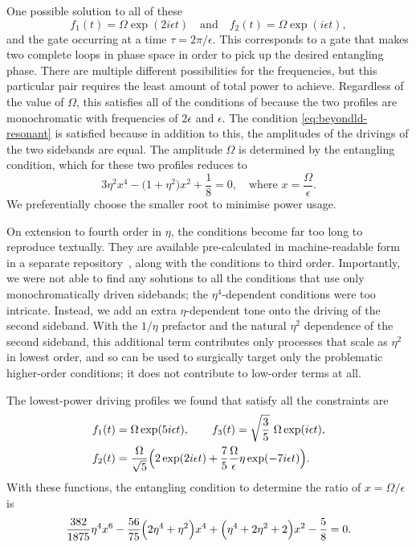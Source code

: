 One possible solution to all of these
\begin{equation}\label{eq:beyondld-drive-2}
f_1(t) = \Omega\exp(2i\epsilon t) \quad\text{and}\quad f_2(t) = \Omega\exp(i\epsilon t),
\end{equation}
and the gate occurring at a time $\tau = 2\pi/\epsilon$.
This corresponds to a gate that makes two complete loops in phase space in order to pick up the desired entangling phase.
There are multiple different possibilities for the frequencies, but this particular pair requires the least amount of total power to achieve.
Regardless of the value of $\Omega$, this satisfies all of the conditions of  because the two profiles are monochromatic with frequencies of $2\epsilon$ and $\epsilon$.
The condition \cref{eq:beyondld-resonant} is satisfied because in addition to this, the amplitudes of the drivings of the two sidebands are equal.
The amplitude $\Omega$ is determined by the entangling condition, which for these two profiles reduces to
\begin{equation}
3\eta^2x^4 - \bigl(1 + \eta^2\bigr)x^2 + \frac18 = 0,\quad\text{where $x=\frac\Omega\epsilon$}.
\end{equation}
We preferentially choose the smaller root to minimise power usage.

On extension to fourth order in $\eta$, the conditions become far too long to reproduce textually.
They are available pre-calculated in machine-readable form in a separate repository~\cite{Sameti2021Code}, along with the conditions to third order.
Importantly, we were not able to find any solutions to all the conditions that use only monochromatically driven sidebands; the $\eta^4$-dependent conditions were too intricate.
Instead, we add an extra $\eta$-dependent tone onto the driving of the second sideband.
With the $1/\eta$ prefactor and the natural $\eta^2$ dependence of the second sideband, this additional term contributes only processes that scale as $\eta^2$ in lowest order, and so can be used to surgically target only the problematic higher-order conditions; it does not contribute to low-order terms at all.

The lowest-power driving profiles we found that satisfy all the constraints are
\begin{equation}\label{eq:beyondld-drive-3}\begin{aligned}
f_1(t) &= \Omega\exp(5i\epsilon t), \qquad f_3(t) = \sqrt{\frac{3}{5}}\ \Omega\exp(i\epsilon t),\\
f_2(t) &= \frac{\Omega}{\sqrt{5}}\Bigl(2\exp(2i\epsilon t) + \frac{7}{5}\frac{\Omega}{\epsilon}\eta\exp(-7i\epsilon t)\Bigr).
\end{aligned}\end{equation}
With these functions, the entangling condition to determine the ratio of $x = \Omega/\epsilon$ is
\begin{equation}\label{eq:beyondld-three-sideband-entangling}
    \frac{382}{1875}\eta^4x^6 - \frac{56}{75}\Bigl(2\eta^4+\eta^2\Bigr)x^4
    +\Bigl(\eta^4 + 2\eta^2 + 2\Bigr)x^2  - \frac58 = 0.
\end{equation}

